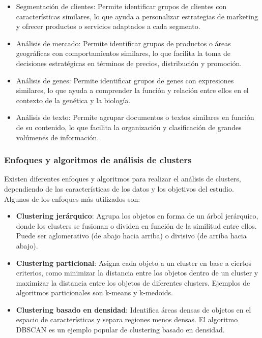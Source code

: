 \documentclass{article}
\begin{document}
\begin{itemize}
  \item Segmentación de clientes: Permite identificar grupos de clientes con características similares, lo que ayuda a personalizar estrategias de marketing y ofrecer productos o servicios adaptados a cada segmento.
  \item Análisis de mercado: Permite identificar grupos de productos o áreas geográficas con comportamientos similares, lo que facilita la toma de decisiones estratégicas en términos de precios, distribución y promoción.
  \item Análisis de genes: Permite identificar grupos de genes con expresiones similares, lo que ayuda a comprender la función y relación entre ellos en el contexto de la genética y la biología.
  \item Análisis de texto: Permite agrupar documentos o textos similares en función de su contenido, lo que facilita la organización y clasificación de grandes volúmenes de información.
\end{itemize}
\subsubsection{Enfoques y algoritmos de análisis de clusters}
Existen diferentes enfoques y algoritmos para realizar el análisis de clusters, dependiendo de las características de los datos y los objetivos del estudio. Algunos de los enfoques más utilizados son:

\begin{itemize}
  \item \textbf{Clustering jerárquico}: Agrupa los objetos en forma de un árbol jerárquico, donde los clusters se fusionan o dividen en función de la similitud entre ellos. Puede ser aglomerativo (de abajo hacia arriba) o divisivo (de arriba hacia abajo).
  \item \textbf{Clustering particional}: Asigna cada objeto a un cluster en base a ciertos criterios, como minimizar la distancia entre los objetos dentro de un cluster y maximizar la distancia entre los objetos de diferentes clusters. Ejemplos de algoritmos particionales son k-means y k-medoids.
  \item \textbf{Clustering basado en densidad}: Identifica áreas densas de objetos en el espacio de características y separa regiones menos densas. El algoritmo DBSCAN es un ejemplo popular de clustering basado en densidad.
\end{itemize}
\end{document}
